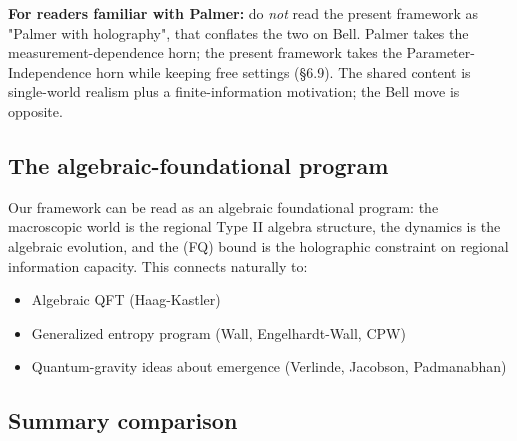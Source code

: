 \documentclass[11pt,a4paper]{article}
\begin{document}
\textbf{For readers familiar with Palmer:} do \emph{not} read the present framework as "Palmer with holography", that conflates the two on Bell. Palmer takes the measurement-dependence horn; the present framework takes the Parameter-Independence horn while keeping free settings (§6.9). The shared content is single-world realism plus a finite-information motivation; the Bell move is opposite.

\subsection{The algebraic-foundational program}

Our framework can be read as an algebraic foundational program: the macroscopic world is the regional Type II algebra structure, the dynamics is the algebraic evolution, and the (FQ) bound is the holographic constraint on regional information capacity. This connects naturally to:

\begin{itemize}
  \item Algebraic QFT (Haag-Kastler)
  \item Generalized entropy program (Wall, Engelhardt-Wall, CPW)
  \item Quantum-gravity ideas about emergence (Verlinde, Jacobson, Padmanabhan)
\end{itemize}

\subsection{Summary comparison}
\end{document}
